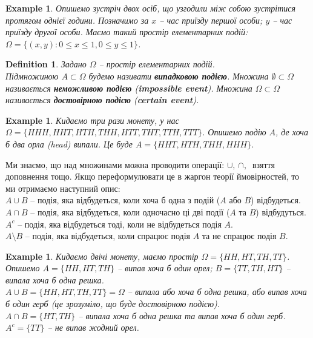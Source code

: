 \documentclass[a4paper, 10pt]{article}
\theoremstyle{theoremdd}
\newtheorem{definition}[theorem]{Definition}
\newtheorem{example}[theorem]{Example}
\begin{document}
\begin{example}
Опишемо зустріч двох осіб, що узгодили між собою зустрітися протягом однієї години. Позначимо за $x$ -- час приїзду першої особи; $y$ -- час приїзду другої особи. Маємо такий простір елементарних подій: $\Omega = \{ (x,y) : 0 \leq x \leq 1, 0 \leq y \leq 1\}$.
\end{example}

\begin{definition}
Задано $\Omega$ -- простір елементарних подій.\\
Підмножиною $A \subset \Omega$ будемо називати \textbf{випадковою подією}. Множина $\emptyset \subset \Omega$ називається \textbf{неможливою подією} (\textbf{impossible event}). Множина $\Omega \subset \Omega$ називається \textbf{достовірною подією} (\textbf{certain event}).
\end{definition}

\begin{example}
Кидаємо три рази монету, у нас $\Omega = \{ HHH, HHT, HTH, THH, HTT, THT, TTH, TTT \}$. Опишемо подію $A$, де хоча б два орла (head) випали. Це буде $A = \{HHT, HTH, THH, HHH\}$.
\end{example}
\noindent
Ми знаємо, що над множинами можна проводити операції: $\cup,\ \cap,\ $ взяття доповнення тощо. Якщо переформулювати це в жаргон теорії ймовірностей, то ми отримаємо наступний опис:\\
$A \cup B$ -- подія, яка відбудеться, коли хоча б одна з подій ($A$ або $B$) відбудеться.\\
$A \cap B$ -- подія, яка відбудеться, коли одночасно ці дві події ($A$ та $B$) відбудуться.\\
$A^c$ -- подія, яка відбудеться тоді, коли не відбудеться подія $A$.\\
$A \setminus B$ -- подія, яка відбудеться, коли спрацює подія $A$ та не спрацює подія $B$.

\begin{example}
Кидаємо двічі монету, маємо простір $\Omega = \{HH,HT,TH,TT\}$. Опишемо $A = \{HH,HT,TH\}$ -- випав хоча б один орел; $B = \{TT,TH,HT\}$ -- випала хоча б одна решка.\\
$A \cup B = \{HH,HT,TH,TT\} = \Omega$ -- випала або хоча б одна решка, або випав хоча б один герб (це зрозуміло, що буде достовірною подією).\\
$A \cap B = \{HT,TH\}$ -- випала хоча б одна решка та випав хоча б один герб.\\
$A^c = \{TT\}$ -- не випав жодний орел.
\end{example}
\end{document}
